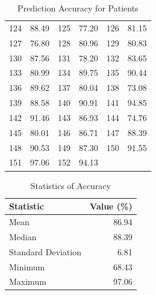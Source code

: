 \documentclass{article}
\begin{document}
\begin{table}[H]
\begin{tabular*}{\textwidth}{@{\extracolsep{\fill}}cccccc}
124 & 88.49 & 125 & 77.20 & 126 & 81.15 \\
127 & 76.80 & 128 & 80.96 & 129 & 80.83 \\
130 & 87.56 & 131 & 78.20 & 132 & 83.65 \\
133 & 80.99 & 134 & 89.75 & 135 & 90.44 \\
136 & 89.62 & 137 & 80.04 & 138 & 73.08 \\
139 & 88.58 & 140 & 90.91 & 141 & 94.85 \\
142 & 91.46 & 143 & 86.93 & 144 & 74.76 \\
145 & 80.01 & 146 & 86.71 & 147 & 88.39 \\
148 & 90.53 & 149 & 87.30 & 150 & 91.55 \\
151 & 97.06 & 152 & 94.13 & & \\

\bottomrule    
\end{tabular*}
\caption{Prediction Accuracy for Patients}
\label{tab:accuracy}
\end{table}

\begin{table}[H]
\centering
\begin{tabular*}{\textwidth}{@{\extracolsep{\fill}}lr}
\toprule
\textbf{Statistic} & \textbf{Value (\%)} \\
\midrule
    
Mean & 86.94 \\
Median & 88.39 \\
Standard Deviation & 6.81 \\
Minimum & 68.43 \\
Maximum & 97.06 \\

\bottomrule
\end{tabular*}
\caption{Statistics of Accuracy}
\label{tab:stats}
\end{table}
\end{document}
